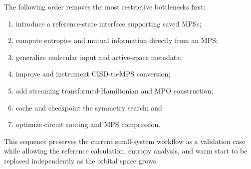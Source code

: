 \documentclass[11pt]{article}
\begin{document}
The following order removes the most restrictive bottlenecks first:
\begin{enumerate}
  \item introduce a reference-state interface supporting saved MPSs;
  \item compute entropies and mutual information directly from an MPS;
  \item generalize molecular input and active-space metadata;
  \item improve and instrument CISD-to-MPS conversion;
  \item add streaming transformed-Hamiltonian and MPO construction;
  \item cache and checkpoint the symmetry search; and
  \item optimize circuit routing and MPS compression.
\end{enumerate}

This sequence preserves the current small-system workflow as a validation
case while allowing the reference calculation, entropy analysis, and warm
start to be replaced independently as the orbital space grows.
\end{document}

